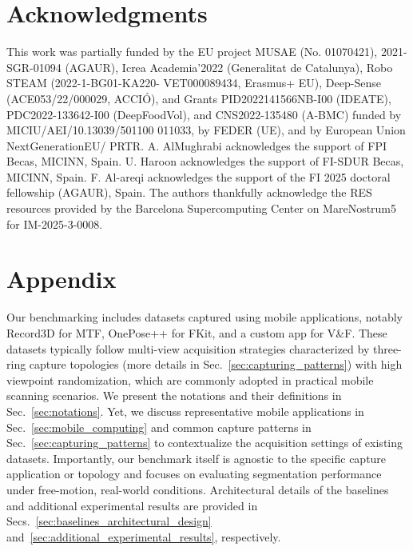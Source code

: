 \documentclass[preprint,12pt]{elsarticle}
\begin{document}
\section{Acknowledgments}
This work was partially funded by the EU project MUSAE (No. 01070421), 2021- SGR-01094 (AGAUR), Icrea Academia’2022 (Generalitat de Catalunya), Robo STEAM (2022-1-BG01-KA220- VET000089434, Erasmus+ EU), Deep-Sense (ACE053/22/000029, ACCIÓ), and Grants PID2022141566NB-I00 (IDEATE), PDC2022-133642-I00 (DeepFoodVol), and CNS2022-135480 (A-BMC) funded by MICIU/AEI/10.13039/501100 011033, by FEDER (UE), and by European Union NextGenerationEU/ PRTR. A. AlMughrabi acknowledges the support of FPI Becas, MICINN, Spain. U. Haroon acknowledges the support of FI-SDUR Becas, MICINN, Spain. F. Al-areqi acknowledges the support of the FI 2025 doctoral fellowship (AGAUR), Spain. The authors thankfully acknowledge the RES resources provided by the Barcelona Supercomputing Center on MareNostrum5 for IM-2025-3-0008. 



 



\section{Appendix}

Our benchmarking includes datasets captured using mobile applications, notably Record3D for MTF, OnePose++ for FKit, and a custom app for V\&F. These datasets typically follow multi-view acquisition strategies characterized by three-ring capture topologies (more details in Sec.~\ref{sec:capturing_patterns}) with high viewpoint randomization, which are commonly adopted in practical mobile scanning scenarios. We present the notations and their definitions in Sec.~\ref{sec:notations}. Yet, we discuss representative mobile applications in Sec.~\ref{sec:mobile_computing} and common capture patterns in Sec.~\ref{sec:capturing_patterns} to contextualize the acquisition settings of existing datasets. Importantly, our benchmark itself is agnostic to the specific capture application or topology and focuses on evaluating segmentation performance under free-motion, real-world conditions. Architectural details of the baselines and additional experimental results are provided in Secs.~\ref{sec:baselines_architectural_design} and~\ref{sec:additional_experimental_results}, respectively.
\end{document}
